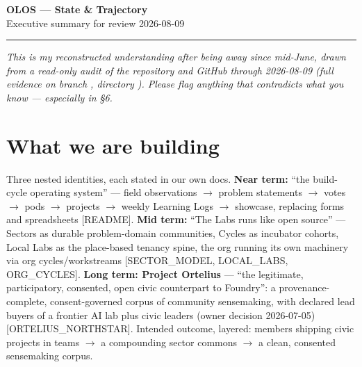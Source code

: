 \documentclass[10pt]{article}
\newcommand{\ev}[1]{{\footnotesize\textcolor{black!60}{[#1]}}}
\begin{document}
{\LARGE\bfseries OLOS --- State \& Trajectory}\\[2pt]
{\large Executive summary for review \hfill \normalsize 2026-08-09}

\vspace{2pt}\hrule\vspace{6pt}

{\itshape This is my reconstructed understanding after being away since mid-June, drawn from a read-only audit of the repository and GitHub through 2026-08-09 (full evidence on branch , directory ). Please flag anything that contradicts what you know --- especially in \S6.}

\section{What we are building}
Three nested identities, each stated in our own docs. \textbf{Near term:} ``the build-cycle operating system'' --- field observations $\rightarrow$ problem statements $\rightarrow$ votes $\rightarrow$ pods $\rightarrow$ projects $\rightarrow$ weekly Learning Logs $\rightarrow$ showcase, replacing forms and spreadsheets \ev{README}. \textbf{Mid term:} ``The Labs runs like open source'' --- Sectors as durable problem-domain communities, Cycles as incubator cohorts, Local Labs as the place-based tenancy spine, the org running its own machinery via org cycles/workstreams \ev{SECTOR\_MODEL, LOCAL\_LABS, ORG\_CYCLES}. \textbf{Long term: Project Ortelius} --- ``the legitimate, participatory, consented, open civic counterpart to Foundry'': a provenance-complete, consent-governed corpus of community sensemaking, with declared lead buyers of a frontier AI lab plus civic leaders (owner decision 2026-07-05) \ev{ORTELIUS\_NORTHSTAR}. Intended outcome, layered: members shipping civic projects in teams $\rightarrow$ a compounding sector commons $\rightarrow$ a clean, consented sensemaking corpus.
\end{document}

